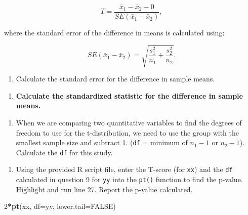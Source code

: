 \documentclass[
]{report}
\newenvironment{Shaded}{\begin{snugshade}}{\end{snugshade}}
\newcommand{\AttributeTok}[1]{\textcolor[rgb]{0.13,0.29,0.53}{#1}}
\newcommand{\ConstantTok}[1]{\textcolor[rgb]{0.56,0.35,0.01}{#1}}
\newcommand{\DecValTok}[1]{\textcolor[rgb]{0.00,0.00,0.81}{#1}}
\newcommand{\FunctionTok}[1]{\textcolor[rgb]{0.13,0.29,0.53}{\textbf{#1}}}
\newcommand{\NormalTok}[1]{#1}
\newcommand{\SpecialCharTok}[1]{\textcolor[rgb]{0.81,0.36,0.00}{\textbf{#1}}}
\providecommand{\tightlist}{%
  \setlength{\itemsep}{0pt}\setlength{\parskip}{0pt}}
\begin{document}
\[T = \frac{\bar{x}_1-\bar{x}_2 -0}{SE(\bar{x}_1-\bar{x}_2)},\]

where the standard error of the difference in means is calculated using:

\[SE(\bar{x}_1 -\bar{x}_2)=\sqrt{\frac{s_1^2}{n_1}+\frac{s_2^2}{n_2}}.\]

\begin{enumerate}
\def\labelenumi{\arabic{enumi}.}
\setcounter{enumi}{6}
\tightlist
\item
  Calculate the standard error for the difference in sample means.
\end{enumerate}

\vspace{0.5in}

\begin{enumerate}
\def\labelenumi{\arabic{enumi}.}
\setcounter{enumi}{7}
\tightlist
\item
  \textbf{Calculate the standardized statistic for the difference in sample means.}
\end{enumerate}

\vspace{0.5in}

\begin{enumerate}
\def\labelenumi{\arabic{enumi}.}
\setcounter{enumi}{8}
\tightlist
\item
  When we are comparing two quantitative variables to find the degrees of freedom to use for the t-distribution, we need to use the group with the smallest sample size and subtract 1. (\texttt{df} = minimum of \(n_1 - 1\) or \(n_2 - 1\)). Calculate the \texttt{df} for this study.
\end{enumerate}

\vspace{0.2in}

\begin{enumerate}
\def\labelenumi{\arabic{enumi}.}
\setcounter{enumi}{9}
\tightlist
\item
  Using the provided R script file, enter the T-score (for \texttt{xx}) and the \texttt{df} calculated in question 9 for \texttt{yy} into the \texttt{pt()} function to find the p-value. Highlight and run line 27. Report the p-value calculated.
\end{enumerate}

\begin{Shaded}
\begin{Highlighting}[]
\DecValTok{2}\SpecialCharTok{*}\FunctionTok{pt}\NormalTok{(xx, }\AttributeTok{df=}\NormalTok{yy, }\AttributeTok{lower.tail=}\ConstantTok{FALSE}\NormalTok{)}
\end{Highlighting}
\end{Shaded}
\end{document}
